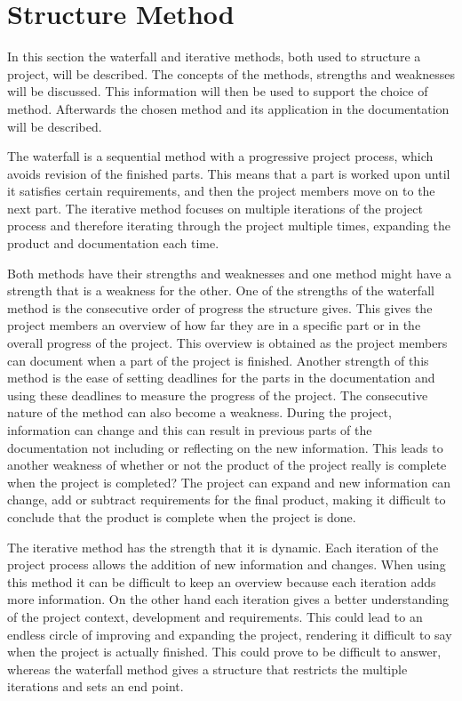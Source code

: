 \chapter{Structure Method}
In this section the waterfall and iterative methods, both used to structure a project, will be described. The concepts of the methods, strengths and weaknesses will be discussed. This information will then be used to support the choice of method. Afterwards the chosen method and its application in the documentation will be described.

The waterfall is a sequential method with a progressive project process, which avoids revision of the finished parts. This means that a part is worked upon until it satisfies certain requirements, and then the project members move on to the next part. The iterative method focuses on multiple iterations of the project process and therefore iterating through the project multiple times, expanding the product and documentation each time.

Both methods have their strengths and weaknesses and one method might have a strength that is a weakness for the other. One of the strengths of the waterfall method is the consecutive order of progress the structure gives. This gives the project members an overview of how far they are in a specific part or in the overall progress of the project. This overview is obtained as the project members can document when a part of the project is finished. Another strength of this method is the ease of setting deadlines for the parts in the documentation and using these deadlines to measure the progress of the project. The consecutive nature of the method can also become a weakness. During the project, information can change and this can result in previous parts of the documentation not including or reflecting on the new information. This leads to another weakness of whether or not the product of the project really is complete when the project is completed? The project can expand and new information can change, add or subtract requirements for the final product, making it difficult to conclude that the product is complete when the project is done. 

The iterative method has the strength that it is dynamic. Each iteration of the project process allows the addition of new information and changes. When using this method it can be difficult to keep an overview because each iteration adds more information. On the other hand each iteration gives a better understanding of the project context, development and requirements. This could lead to an endless circle of improving and expanding the project, rendering it difficult to say when the project is actually finished. This could prove to be difficult to answer, whereas the waterfall method gives a structure that restricts the multiple iterations and sets an end point. 

